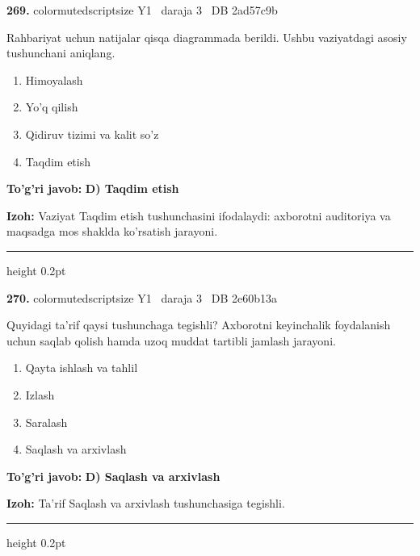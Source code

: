\documentclass[10pt,a4paper,oneside]{article}
\begin{document}
\noindent\textbf{\color{ink}269.}  {color{muted}scriptsize Y1 \textbullet\ daraja 3 \textbullet\ DB 2ad57c9b}
\par
Rahbariyat uchun natijalar qisqa diagrammada berildi. Ushbu vaziyatdagi asosiy tushunchani aniqlang.
\begin{enumerate}[label=\Alph*),leftmargin=9mm]
\item Himoyalash
\item Yo'q qilish
\item Qidiruv tizimi va kalit so'z
\item Taqdim etish
\end{enumerate}
\begin{tcolorbox}[enhanced,breakable,colback=teal!4,colframe=teal!50!black,boxrule=0.5pt,arc=1.1mm,left=3mm,right=3mm,top=1.7mm,bottom=1.7mm,before skip=2mm,after skip=2mm]
\textbf{\color{teal}To'g'ri javob:} \textbf{D) Taqdim etish}
\par\smallskip
\textbf{Izoh:} Vaziyat Taqdim etish tushunchasini ifodalaydi: axborotni auditoriya va maqsadga mos shaklda ko'rsatish jarayoni.
\end{tcolorbox}
\vspace{2mm}\hrule height 0.2pt \vspace{3mm}

\noindent\textbf{\color{ink}270.}  {color{muted}scriptsize Y1 \textbullet\ daraja 3 \textbullet\ DB 2e60b13a}
\par
Quyidagi ta'rif qaysi tushunchaga tegishli? Axborotni keyinchalik foydalanish uchun saqlab qolish hamda uzoq muddat tartibli jamlash jarayoni.
\begin{enumerate}[label=\Alph*),leftmargin=9mm]
\item Qayta ishlash va tahlil
\item Izlash
\item Saralash
\item Saqlash va arxivlash
\end{enumerate}
\begin{tcolorbox}[enhanced,breakable,colback=teal!4,colframe=teal!50!black,boxrule=0.5pt,arc=1.1mm,left=3mm,right=3mm,top=1.7mm,bottom=1.7mm,before skip=2mm,after skip=2mm]
\textbf{\color{teal}To'g'ri javob:} \textbf{D) Saqlash va arxivlash}
\par\smallskip
\textbf{Izoh:} Ta'rif Saqlash va arxivlash tushunchasiga tegishli.
\end{tcolorbox}
\vspace{2mm}\hrule height 0.2pt \vspace{3mm}
\end{document}
